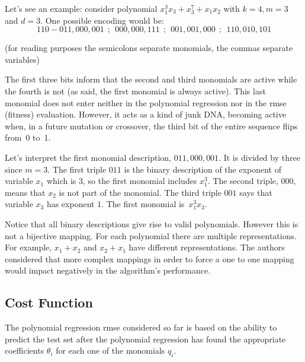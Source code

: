 \documentclass{elsarticle}
\begin{document}
Let's see an example: consider polynomial $x_1^3 x_3 + x_3^7 + x_1 x_2$ with $k = 4, m = 3$ and $d=3$. One possible encoding would be:
$$110 - 011,000,001~~;~~000,000,111~~;~~001,001,000~~;~~110,010,101$$

(for reading purposes the semicolons separate monomials, the commas separate variables)

The first three bits inform that the second and third monomials are active while the fourth is not (as said, the first monomial is always active). This last monomial does not enter neither in the polynomial regression nor in the \ac{rmse} (fitness) evaluation. However, it acts as a kind of junk DNA, becoming active when, in a future mutation or crossover, the third bit of the entire sequence flips from~0 to~1.

Let's interpret the first monomial description, $011,000,001$. It is divided by three since $m=3$. The first triple $011$ is the binary description of the exponent of variable $x_1$ which is 3, so the first monomial includes $x_1^3$. The second triple, $000$, means that $x_2$ is not part of the monomial. The third triple $001$ says that variable $x_3$ has exponent $1$. The first monomial is~$x_1^3 x_3$.

Notice that all binary descriptions give rise to valid polynomials. However this is not a bijective mapping. For each polynomial there are multiple representations. For example, $x_1+x_2$ and $x_2+x_1$ have different representations. The authors considered that more complex mappings in order to force a one to one mapping would impact negatively in the algorithm's performance.


\subsection{Cost Function}\label{subs:cost.function}

The polynomial regression \ac{rmse} considered so far is based on the ability to predict the test set after the polynomial regression has found the appropriate coefficients $\theta_i$ for each one of the monomials $q_i$.
\end{document}
